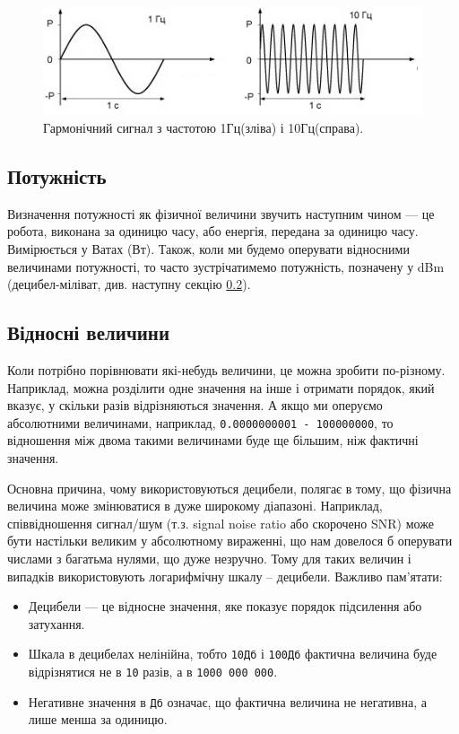 \documentclass{article}
\begin{document}
\begin{figure}[h!]
\centering
\includegraphics[width=0.7\linewidth]{images/frequency.png}
\caption{\label{fig:frequency}Гармонічний сигнал з частотою 1Гц(зліва) і 10Гц(справа).}
\end{figure}

\subsection{Потужність}
Визначення потужності як фізичної величини звучить наступним чином --- це робота, виконана за одиницю часу, або енергія, передана за одиницю часу. Вимірюється у Ватах (Вт). Також, коли ми будемо оперувати відносними величинами потужності, то часто зустрічатимемо потужність, позначену у dBm (децибел-міліват, див. наступну секцію \ref{sec:db}).


\subsection{Відносні величини}
\label{sec:db}
Коли потрібно порівнювати які-небудь величини, це можна зробити по-різному. Наприклад, можна розділити одне значення на інше і отримати порядок, який вказує, у скільки разів відрізняються значення. А якщо ми оперуємо абсолютними величинами, наприклад, \texttt{0.0000000001 - 100000000}, то відношення між двома такими величинами буде ще більшим, ніж фактичні значення.

Основна причина, чому використовуються децибели, полягає в тому, що фізична величина може змінюватися в дуже широкому діапазоні. Наприклад, співвідношення сигнал/шум (т.з. signal noise ratio або скорочено SNR) може бути настільки великим у абсолютному вираженні, що нам довелося б оперувати числами з багатьма нулями, що дуже незручно. Тому для таких величин і випадків використовують логарифмічну шкалу -- децибели. Важливо пам'ятати:
\begin{itemize}[noitemsep, topsep=8pt]
\item Децибели --- це відносне значення, яке показує порядок підсилення або затухання.
\item Шкала в децибелах нелінійна, тобто \texttt{10Дб} і \texttt{100Дб} фактична величина буде відрізнятися не в \texttt{10} разів, а в \texttt{1000 000 000}.
\item Негативне значення в \texttt{Дб} означає, що фактична величина не негативна, а лише менша за одиницю.
\end{itemize}
\end{document}
